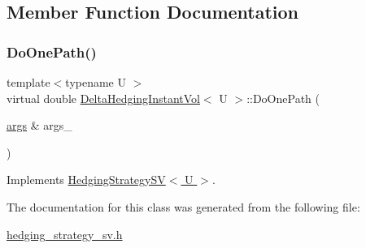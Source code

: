 \subsection{Member Function Documentation}
\hypertarget{classDeltaHedgingInstantVol_ac05386c300db720ed07d8465123a8f7a}{}\label{classDeltaHedgingInstantVol_ac05386c300db720ed07d8465123a8f7a} 
\subsubsection{\texorpdfstring{Do\+One\+Path()}{DoOnePath()}}
{\footnotesize\ttfamily template$<$typename U $>$ \\
virtual double \hyperlink{classDeltaHedgingInstantVol}{Delta\+Hedging\+Instant\+Vol}$<$ U $>$\+::Do\+One\+Path (\begin{DoxyParamCaption}\item[{\hyperlink{path__generation_8h_a75c13cde2074f502cc4348c70528572d}{args} \&}]{args\+\_\+ }\end{DoxyParamCaption})\hspace{0.3cm}{\ttfamily [virtual]}}



Implements \hyperlink{classHedgingStrategySV_abb9531c069f4d1e758fc23c4bc7ed09c}{Hedging\+Strategy\+S\+V$<$ U $>$}.



The documentation for this class was generated from the following file\+:\begin{DoxyCompactItemize}
\item 
\hyperlink{hedging__strategy__sv_8h}{hedging\+\_\+strategy\+\_\+sv.\+h}\end{DoxyCompactItemize}
